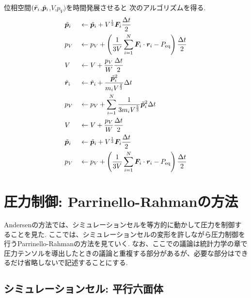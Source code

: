  位相空間$(\Tilde{\bm{r}}_{i}$,$\Tilde{\bm{p}}_{i}$,$V$,$p_{V})$を時間発展させると
 次のアルゴリズムを得る. 
\begin{alignat}{2}
  &\Tilde{\bm{p}}_{i}
  &&\gets
  \Tilde{\bm{p}}_{i}
  +
  V^{\frac{1}{3}} \bm{F}_{i} \frac{\Delta t}{2}
  \label{eq:Andersen21.1}
  \\
  & p_{V}
  &&\gets
  p_{V}
  + \left(
          \frac{1}{3V} \sum_{i=1}^{N} \bm{F}_{i}
          \cdot \bm{r}_{i} - P_{\mathrm{eq}}
    \right)
    \frac{\Delta t}{2}
  \label{eq:Andersen21.2}
  \\
  &V
  &&\gets
  V + \frac{p_{V}}{W} \frac{\Delta t}{2}
  \label{eq:Andersen21.3}
  \\
  &\Tilde{\bm{r}}_{i}
  &&\gets
  \Tilde{\bm{r}}_{i}
  + \frac{\Tilde{\bm{p}}_{i}^{2}}{m_{i} V^{\frac{2}{3}}} \Delta t
  \label{eq:Andersen21.4}
   \\
  &p_{V}
  &&\gets
  p_{V}
  + \sum_{i=1}^{N}
    \frac{1}{3 m_{i} V^{\frac{5}{3}}}
    \Tilde{\bm{p}}_{i}^{2} \Delta t
  \label{eq:Andersen21.5}
  \\
  &V
  &&\gets
  V + \frac{p_{V}}{W} \frac{\Delta t}{2}
  \label{eq:Andersen21.6}
  \\
  &\Tilde{\bm{p}}_{i}
  &&\gets
  \Tilde{\bm{p}}_{i}
  + V^{\frac{1}{3}} \bm{F}_{i} \frac{\Delta t}{2}
  \label{eq:Andersen21.4}
  \\
   &p_{V}
   &&\gets p_{V}
   + \left(
            \frac{1}{3V} \sum_{i=1}^{N} \bm{F}_{i}
            \cdot \bm{r}_{i} - P_{\mathrm{eq}}
    \right)
    \frac{\Delta t}{2}
 \label{eq:Andersen21.5}
\end{alignat}

\clearpage

\section{圧力制御: Parrinello-Rahmanの方法}
Andersenの方法では、シミュレーションセルを等方的に動かして圧力を制御することを見た.
ここでは、シミュレーションセルの変形を許しながら圧力制御を行うParrinello-Rahmanの方法を見ていく. なお、ここでの議論は統計力学の章で圧力テンソルを導出したときの議論と重複する部分があるが、必要な部分はできるだけ省略しないで記述することにする.

\subsection{シミュレーションセル: 平行六面体}
